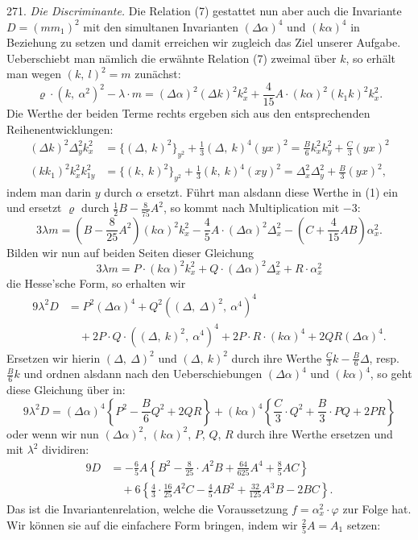 \documentclass[11pt]{article}
\providecommand{\weq}[2]{\begin{equation}\tag{#1}#2\end{equation}}
\let\Delta\varDelta
\begin{document}
271. \textit{Die Discriminante.} Die Relation (7) gestattet nun aber
auch die Invariante $D=(mm_1)^2$ mit den simultanen Invarianten
$(\varDelta\alpha)^4$ und $(k\alpha)^4$ in Beziehung zu setzen und damit erreichen wir zugleich
 das Ziel unserer Aufgabe. Ueberschiebt man nämlich die erwähnte
 Relation (7) zweimal über $k$, so erhält man wegen $(k,\ l)^2=m$
zunächst:
\weq{1}{\varrho\cdot(k,\ \alpha^2)^2-\lambda\cdot m=(\varDelta\alpha)^2(\varDelta k)^2k_x^2+\frac{4}{15}A\cdot(k\alpha)^2(k_1k)^2k_x^2.}
Die Werthe der beiden Terme rechts ergeben sich aus den entsprechenden
 Reihenentwicklungen:
\[
\begin{aligned}
(\varDelta k)^2\varDelta_y^2k_x^2 &= \{(\varDelta,\ k)^2\}_{y^2}+\frac{1}{3}(\varDelta,\ k)^4(yx)^2=\frac{B}{6}k_x^2k_y^2+\frac{C}{3}(yx)^2\\
(kk_1)^2k_x^2k_{1y}^2 &= \{(k,\ k)^2\}_{y^2}+\frac{1}{3}(k,\ k)^4(xy)^2=\varDelta_x^2\varDelta_y^2+\frac{B}{3}(yx)^2,
\end{aligned}
\]
indem man darin $y$ durch $\alpha$ ersetzt. Führt man alsdann diese
Werthe in (1) ein und ersetzt $\varrho$ durch $\frac{1}{2}B-\frac{8}{75}A^2$, so kommt
nach Multiplication mit $-3$:
\[
3\lambda m=\left(B-\frac{8}{25}A^2\right)(k\alpha)^2k_x^2-\frac{4}{5}A\cdot(\varDelta\alpha)^2\varDelta_x^2-\left(C+\frac{4}{15}AB\right)\alpha_x^2.
\]
Bilden wir nun auf beiden Seiten dieser Gleichung
\[
3\lambda m=P\cdot(k\alpha)^2k_x^2+Q\cdot(\varDelta\alpha)^2\varDelta_x^2+R\cdot\alpha_x^2
\]
die Hesse'sche Form, so erhalten wir
\[
\begin{aligned}
9\lambda^2D &= P^2(\varDelta\alpha)^4+Q^2((\varDelta,\ \varDelta)^2,\ \alpha^4)^4\\
&\quad+2P\cdot Q\cdot((\varDelta,\ k)^2,\ \alpha^4)^4+2P\cdot R\cdot(k\alpha)^4+2QR(\varDelta\alpha)^4.
\end{aligned}
\]
Ersetzen wir hierin $(\varDelta,\ \varDelta)^2$ und $(\varDelta,\ k)^2$ durch ihre Werthe
$\frac{C}{3}k-\frac{B}{6}\varDelta$, resp. $\frac{B}{6}k$ und ordnen alsdann nach den Ueberschiebungen
$(\varDelta\alpha)^4$ und $(k\alpha)^4$, so geht diese Gleichung über in:
\[
9\lambda^2D=(\varDelta\alpha)^4\left\{P^2-\frac{B}{6}Q^2+2QR\right\}+(k\alpha)^4\left\{\frac{C}{3}\cdot Q^2+\frac{B}{3}\cdot PQ+2PR\right\}
\]
oder wenn wir nun $(\varDelta\alpha)^2$, $(k\alpha)^2$, $P$, $Q$, $R$ durch ihre Werthe ersetzen
und mit $\lambda^2$ dividiren: %
\[
\begin{aligned}
9D &= -\frac{6}{5}A\left\{B^2-\frac{8}{25}\cdot A^2B+\frac{64}{625}A^4+\frac{8}{5}AC\right\}\\
&\quad+6\left\{\frac{4}{3}\cdot\frac{16}{25}A^2C-\frac{4}{5}AB^2+\frac{32}{125}A^3B-2BC\right\}.
\end{aligned}
\]
Das ist die Invariantenrelation, welche die Voraussetzung $f=\alpha_x^2\cdot\varphi$
zur Folge hat. Wir können sie auf die einfachere Form bringen,
indem wir $\frac{2}{5}A=A_1$ setzen:
\end{document}
